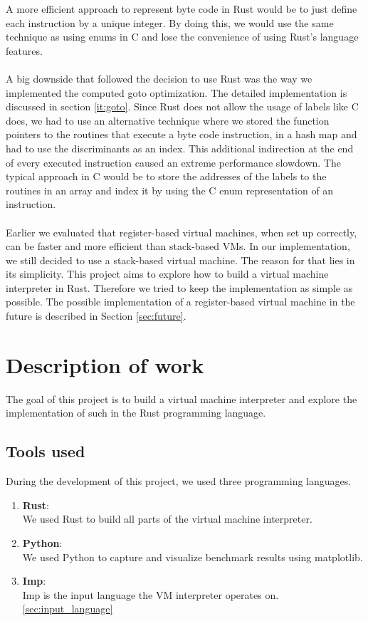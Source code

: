 \documentclass{article}
\begin{document}
A more efficient approach to represent byte code in Rust would be to just
define each instruction by a unique integer. By doing this, we would use the
same technique as using enums in C and lose the convenience of using Rust's
language features.
\\\\ 
A big downside that followed the decision to use Rust was the way we
implemented the computed goto optimization. The detailed implementation is
discussed in section \ref{it:goto}. Since Rust does not allow the usage of
labels like C does, we had to use an alternative technique where we stored the
function pointers to the routines that execute a byte code instruction, in a
hash map and had to use the discriminants as an index. This additional
indirection at the end of every executed instruction caused an extreme
performance slowdown. The typical approach in C would be to store the addresses
of the labels to the routines in an array and index it by using the C enum
representation of an instruction.
\\\\
Earlier we evaluated that register-based virtual machines, when set up
correctly, can be faster and more efficient than stack-based VMs.
In our implementation, we still decided to use a stack-based virtual machine.
The reason for that lies in its simplicity. This project aims to explore
how to build a virtual machine interpreter in Rust. Therefore we tried to
keep the implementation as simple as possible. The possible implementation of
a register-based virtual machine in the future is described in Section
\ref{sec:future}.

\section{Description of work}
The goal of this project is to build a virtual machine interpreter and 
explore the implementation of such in the Rust programming language.

\subsection{Tools used}
During the development of this project, we used three programming languages. 

\begin{enumerate}
    \item \textbf{Rust}:\\
        We used Rust to build all parts of the virtual machine interpreter.
    \item \textbf{Python}:\\
        We used Python to capture and visualize benchmark results using matplotlib.
    \item \textbf{Imp}:\\
        Imp is the input language the VM interpreter operates on. \ref{sec:input_language}
\end{enumerate}
\end{document}
